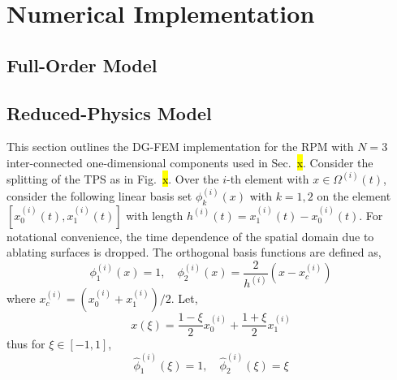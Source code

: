 \appendix

\section{Numerical Implementation}\label{app_implementation}

\subsection{Full-Order Model}

\subsection{Reduced-Physics Model}

This section outlines the DG-FEM implementation for the RPM with $N=3$ inter-connected one-dimensional components used in Sec.~\hl{x}. Consider the splitting of the TPS as in Fig.~\hl{x}. Over the $i$-th element with $x\in\Omega^{(i)}(t)$, consider the following linear basis set $\phi_k^{(i)}(x)$ with $k=1,2$ on the element $[x^{(i)}_{0}(t),x^{(i)}_{1}(t)]$ with length $h^{(i)}(t)=x^{(i)}_{1}(t) - x^{(i)}_{0}(t)$. For notational convenience, the time dependence of the spatial domain due to ablating surfaces is dropped. The orthogonal basis functions are defined as,
\begin{equation}
    \phi^{(i)}_1(x) = 1,\quad \phi^{(i)}_2(x) = \frac{2}{h^{(i)}}\left(x - x^{(i)}_c\right)
\end{equation}
where $x^{(i)}_c = (x^{(i)}_0 + x^{(i)}_1) / 2$. Let,
\[
    x(\xi) = \frac{1-\xi}{2}x^{(i)}_0 + \frac{1 + \xi}{2}x^{(i)}_{1}
\]
thus for $\xi\in[-1,1]$,
\begin{equation}
    \hat{\phi}^{(i)}_1(\xi) = 1, \quad \hat{\phi}^{(i)}_2(\xi) = \xi
\end{equation}

